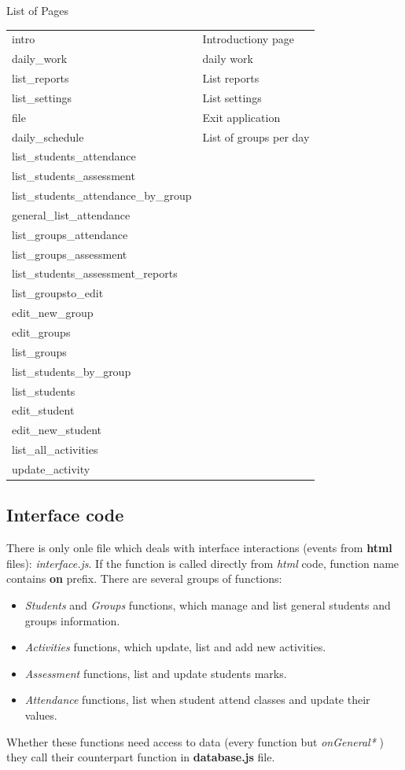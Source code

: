 \begin{bclogo}[couleur=orange!30,logo=\bcbook,arrondi=0.1,ombre=true ] 
{List of Pages}
\begin{tabular}{l|l}
intro & Introductiony page              \\
daily\_work & daily work \\
list\_reports & List reports             \\
list\_settings  & List settings\\
file & Exit application                  \\
daily\_schedule & List of groups per day\\
list\_students\_attendance &             \\
list\_students\_assessment &  \\
list\_students\_attendance\_by\_group &  \\
general\_list\_attendance &  \\
list\_groups\_attendance  &              \\
list\_groups\_assessment &  \\
list\_students\_assessment\_reports &    \\
list\_groupsto\_edit &  \\
edit\_new\_group &                      \\
 edit\_groups  & \\
list\_groups &                          \\
  list\_students\_by\_group & \\
list\_students &                        \\
  edit\_student   &   \\
edit\_new\_student &                    \\
  list\_all\_activities & \\
update\_activity  &                     
\end{tabular}

\end{bclogo}	

	
	\subsection{Interface code }
	There is only onle file which deals with interface interactions (events from {\bf html} files): \emph{ interface.js}.
If the function is called directly from \emph{html}	code, function name contains {\bf on} prefix.
There are several groups of functions:
\begin{itemize}
    \item \emph{Students} and \emph{Groups} functions, which manage and list general students and groups information.
    \item \emph{Activities} functions, which update, list and add new activities.
    \item \emph{Assessment} functions, list and update students marks.
    \item \emph{Attendance} functions, list when student attend classes and update their values.
\end{itemize}
Whether these functions need access to data (every function but \emph{ onGeneral* } ) they call  their counterpart 
function in {\bf database.js } file.

